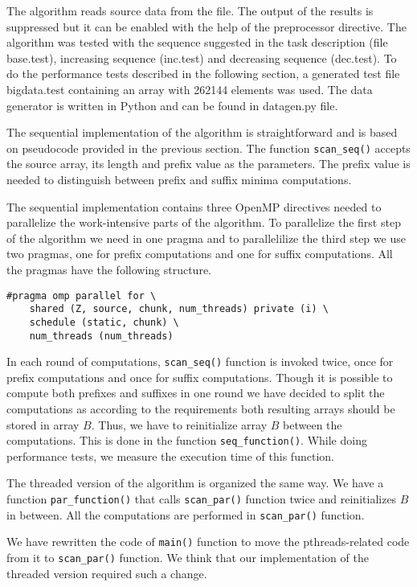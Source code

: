 \documentclass[a4paper,10pt,notitlepage]{article}
\begin{document}
The algorithm reads source data from the file. The output of the results is suppressed but it can be enabled with the help of the preprocessor directive. The algorithm was tested with the sequence suggested in the task description (file base.test), increasing sequence (inc.test) and decreasing sequence (dec.test). To do the performance tests described in the following section, a generated test file bigdata.test containing an array with 262144 elements was used. The data generator is written in Python and can be found in datagen.py file.

The sequential implementation of the algorithm is straightforward and is based on pseudocode provided in the previous section. The function \lstinline{scan_seq()} accepts the source array, its length and prefix value as the parameters. The prefix value is needed to distinguish between prefix and suffix minima computations. 

The sequential implementation contains three OpenMP directives needed to parallelize the work-intensive parts of the algorithm. To parallelize the first step of the algorithm we need in one pragma and to parallelilize the third step we use two pragmas, one for prefix computations and one for suffix computations. All the pragmas have the following structure.

\begin{lstlisting}
#pragma omp parallel for \
	shared (Z, source, chunk, num_threads) private (i) \
	schedule (static, chunk) \
	num_threads (num_threads)
\end{lstlisting}

In each round of computations, \lstinline{scan_seq()} function is invoked twice, once for prefix computations and once for suffix computations. Though it is possible to compute both prefixes and suffixes in one round we have decided to split the computations as according to the requirements both resulting arrays should be stored in array $B$. Thus, we have to reinitialize array $B$ between the computations. This is done in the function \lstinline{seq_function()}. While doing performance tests, we measure the execution time of this function.

The threaded version of the algorithm is organized the same way. We have a function \lstinline{par_function()} that calls \lstinline{scan_par()} function twice and reinitializes $B$ in between. All the computations are performed in \lstinline{scan_par()} function. 

We have rewritten the code of \lstinline{main()} function to move the pthreads-related code from it to \lstinline{scan_par()} function. We think that our implementation of the threaded version required such a change. 
\end{document}
